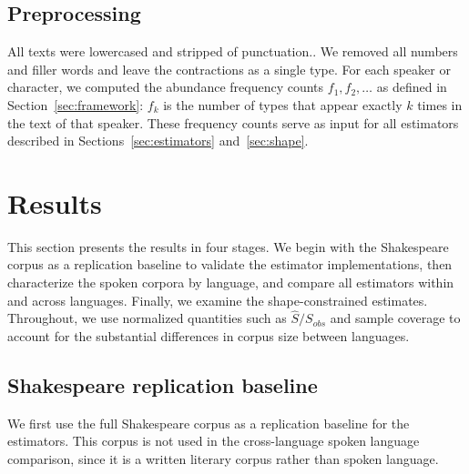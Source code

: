 ﻿\documentclass{article}
\begin{document}
\subsection{Preprocessing}
All texts were lowercased and stripped of punctuation.. We removed all numbers and filler words and leave the contractions as a single type.
For each speaker or character, we computed the abundance frequency counts $f_1, f_2, \ldots$ as defined in Section~\ref{sec:framework}: $f_k$ is the number of types that appear exactly $k$ times in the text of that speaker. These frequency counts serve as input for all estimators described in Sections~\ref{sec:estimators} and~\ref{sec:shape}.

\clearpage
\section{Results}\label{sec:results}
This section presents the results in four stages. We begin with the Shakespeare corpus as a replication baseline to validate the estimator implementations, then characterize the spoken corpora by language, and compare all estimators within and across languages. Finally, we examine the shape-constrained estimates. Throughout, we use normalized quantities such as $\hat{S}/S_{obs}$ and sample coverage to account for the substantial differences in corpus size between languages.

\subsection{Shakespeare replication baseline}

We first use the full Shakespeare corpus as a replication baseline for the estimators. This corpus is not used in the cross-language spoken language comparison, since it is a written literary corpus rather than spoken language.
\end{document}
